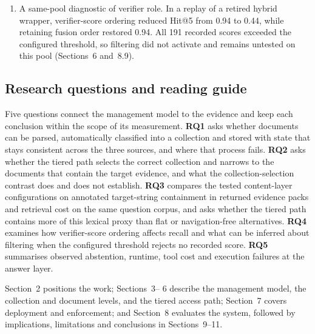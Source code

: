 \documentclass[11pt]{article}
\begin{document}
\begin{enumerate}
generated no answers; the R3 read-all run was incomplete. Separately, two
ten-question answer grids reported gold identifiers in the answer or trace for
all 60 cells. Because a trace identifier need not have been read, this check
cannot establish document reachability; document-style citation markers
separated the arms (9/7/2, and 9/9/9 on a common substrate). These lexical
checks do not establish semantic correctness or claim-to-source support
(Sections~8.6 and~8.7).
\item A same-pool diagnostic of verifier role. In a replay of a retired hybrid
wrapper, verifier-score ordering reduced Hit@5 from 0.94 to 0.44, while retaining
fusion order restored 0.94. All 191 recorded scores exceeded the configured
threshold, so filtering did not activate and remains untested on this pool
(Sections~6 and~8.9).
\end{enumerate}

\subsection{Research questions and reading guide}


Five questions connect the management model to the evidence and keep each
conclusion within the scope of its measurement. \textbf{RQ1} asks whether
documents can be parsed, automatically classified into a collection and stored
with state that stays consistent across the three sources, and where that
process fails. \textbf{RQ2} asks whether the tiered path selects the correct
collection and narrows to the documents that contain the target evidence, and
what the collection-selection contrast does and does not establish.
\textbf{RQ3} compares the tested content-layer configurations on
annotated target-string containment in returned evidence packs and retrieval
cost on the same question corpus, and asks whether the tiered path contains
more of this lexical proxy than flat or navigation-free alternatives.
\textbf{RQ4} examines
how verifier-score ordering affects recall and what can be inferred about
filtering when the configured threshold rejects no recorded score.
\textbf{RQ5} summarises observed abstention, runtime, tool cost and execution
failures at the answer layer.

Section~2 positions the work; Sections~3--
6 describe the management model, the collection and
document levels, and the tiered access path;
Section~7 covers deployment and enforcement; and
Section~8 evaluates the system, followed by implications,
limitations and conclusions in
Sections~9--11.
\end{document}
